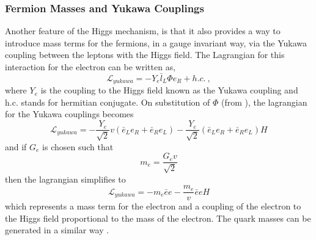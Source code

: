 \subsubsection{Fermion Masses and Yukawa Couplings}

Another feature of the Higgs mechanism, is that it also provides a way to
introduce mass terms for the fermions, in a gauge invariant way, via the Yukawa
coupling between the leptons with the Higgs field. The Lagrangian for this
interaction for the electron can be written as, 
\begin{equation}
\mathcal{L}_{yukawa} = -Y_{e}\bar{l}_L\Phi e_R + h.c. \ ,
\end{equation}
where $Y_{e}$ is the coupling to the Higgs field known as the Yukawa coupling
and h.c. stands for hermitian conjugate. On substitution of $\Phi$ (from
\EquationRef{}), the lagrangian for the Yukawa couplings becomes
\begin{equation}
\mathcal{L}_{yukawa} = 
-\frac{Y_{e}}{\sqrt{2}} v
(\bar{e}_L e_R + \bar{e}_R e_L)
-\frac{Y_{e}}{\sqrt{2}}
(\bar{e}_L e_R + \bar{e}_R e_L)H
\end{equation}
and if $G_e$ is chosen such that
\begin{equation}
m_{e} = \frac{G_{e}v}{\sqrt{2}}
\end{equation}
then the lagrangian simplifies to
\begin{equation}
\mathcal{L}_{yukawa} = 
- m_e \bar{e}e
- \frac{m_e}{v} \bar{e}e H
\end{equation}
which represents a mass term for the electron and a coupling of the electron to
the Higgs field proportional to the mass of the electron.
The quark masses can be generated in a similar way \cite{halzen}.




